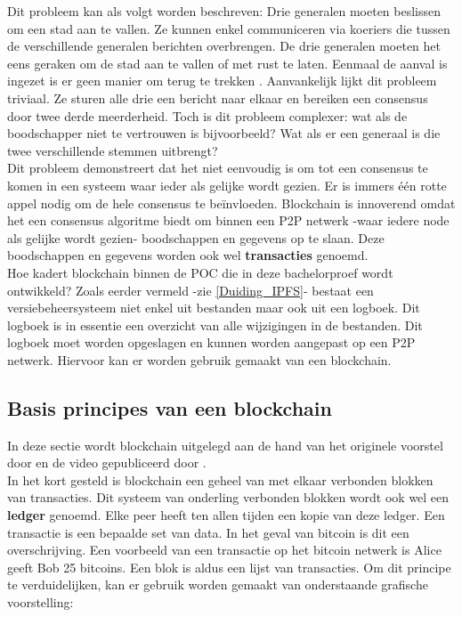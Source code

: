 Dit probleem kan als volgt worden beschreven: Drie generalen moeten beslissen om een stad aan te vallen. Ze kunnen enkel communiceren via koeriers die tussen de verschillende generalen berichten overbrengen. De drie generalen moeten het eens geraken om de stad aan te vallen of met rust te laten. Eenmaal de aanval is ingezet is er geen manier om terug te trekken \autocite{Peter2018}. Aanvankelijk lijkt dit probleem triviaal. Ze sturen alle drie een bericht naar elkaar en bereiken een consensus door twee derde meerderheid. Toch is dit probleem complexer: wat als de boodschapper niet te vertrouwen is bijvoorbeeld? Wat als er een generaal is die twee verschillende stemmen uitbrengt?\\

Dit probleem demonstreert dat het niet eenvoudig is om tot een consensus te komen in een systeem waar ieder als gelijke wordt gezien. Er is immers één rotte appel nodig om de hele consensus te beïnvloeden. Blockchain is innoverend omdat het een consensus algoritme biedt om binnen een P2P netwerk -waar iedere node als gelijke wordt gezien- boodschappen en gegevens op te slaan. Deze boodschappen en gegevens worden ook wel \textbf{transacties} genoemd.\\

Hoe kadert blockchain binnen de POC die in deze bachelorproef wordt ontwikkeld? Zoals eerder vermeld -zie \ref{Duiding_IPFS}- bestaat een versiebeheersysteem niet enkel uit bestanden maar ook uit een logboek. Dit logboek is in essentie een overzicht van alle wijzigingen in de bestanden. Dit logboek moet worden opgeslagen en kunnen worden aangepast op een P2P netwerk. Hiervoor kan er worden gebruik gemaakt van een blockchain.\\

\subsection{Basis principes van een blockchain}
In deze sectie wordt blockchain uitgelegd aan de hand van het originele voorstel door \textcite{Satoshi2009} en de video gepubliceerd door \textcite{Blue2017}.\\

In het kort gesteld is blockchain een geheel van met elkaar verbonden blokken van transacties. Dit systeem van onderling verbonden blokken wordt ook wel een \textbf{ledger} genoemd. Elke peer heeft ten allen tijden een kopie van deze ledger. Een transactie is een bepaalde set van data. In het geval van bitcoin is dit een overschrijving. Een voorbeeld van een transactie op het bitcoin netwerk is Alice geeft Bob 25 bitcoins. Een blok is aldus een lijst van transacties. Om dit principe te verduidelijken, kan er gebruik worden gemaakt van onderstaande grafische voorstelling:\\

